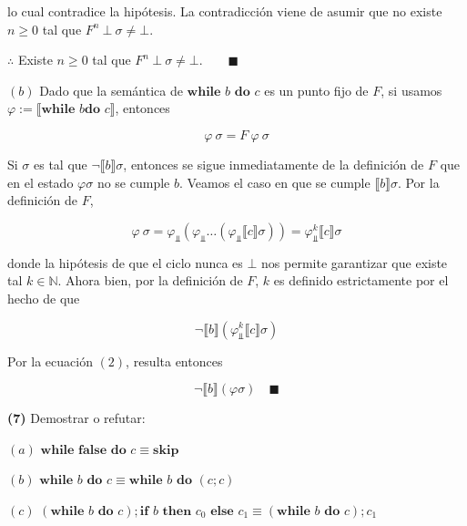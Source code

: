\documentclass[a4paper, 12pt]{article}
\begin{document}
lo cual contradice la hipótesis. La contradicción viene de asumir que no existe
$n \geq 0$ tal que $F^n ~ \bot  ~ \sigma \neq \bot $. 

$\therefore $ Existe $n \geq 0$ tal que $F^n ~ \bot ~ \sigma \neq \bot. \qquad
\blacksquare $

$(b)$  Dado que la semántica de $\textbf{while } b \textbf{ do } c$ es un
punto fijo de $F$, si usamos $\varphi := \llbracket \textbf{while } b \textbf{
do } c \rrbracket$, entonces

\begin{equation*}
  \varphi ~ \sigma = F ~ \varphi ~ \sigma
\end{equation*}

Si $\sigma$ es tal que $\neg \llbracket b \rrbracket\sigma$, entonces se sigue
inmediatamente de la definición de $F$ que en el estado $\varphi \sigma$ no se
cumple $b$. Veamos el caso en que se cumple $\llbracket b \rrbracket\sigma$.
Por la definición de $F$, 


\begin{equation}
  \varphi ~ \sigma = \varphi_{\Bot}\left( \varphi_{\Bot} \ldots \left(
  \varphi_{\Bot}\llbracket c \rrbracket \sigma \right)  \right) =
  \varphi_{\Bot}^k \llbracket c \rrbracket\sigma
\end{equation}

donde la hipótesis de que el ciclo nunca es $\bot$ nos permite garantizar que
existe tal $k \in \mathbb{N}$. Ahora bien, por la definición de $F$, $k$ es
definido estrictamente por el hecho de que

\begin{equation*}
  \neg \llbracket b \rrbracket( \varphi^k_{\Bot}\llbracket c \rrbracket\sigma )
\end{equation*}

Por la ecuación $(2)$, resulta entonces 

\begin{equation*}
  \neg\llbracket b \rrbracket\left( \varphi \sigma \right) \quad \blacksquare
\end{equation*}

\pagebreak 

\begin{myframe}
  \textbf{(7)} Demostrar o refutar:

  $(a)$ $\textbf{while } \textbf{false do } c \equiv \textbf{skip}$

  $(b)$ $\textbf{while } b \textbf{ do } c \equiv \textbf{while } b \textbf{ do
  } (c;c)$ 

  $(c)$  $(\textbf{while } b \textbf{ do } c); \textbf{if } b \textbf{ then }
  c_0 \textbf{ else } c_1 \equiv (\textbf{while } b \textbf{ do } c); c_1$
\end{myframe}
\end{document}
